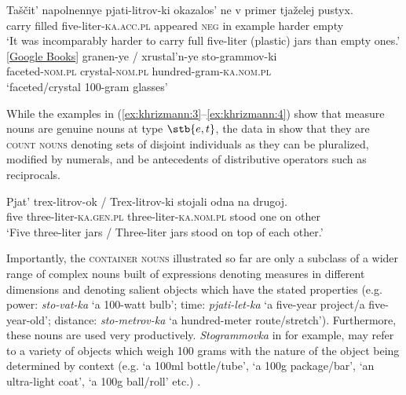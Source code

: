 \documentclass[output=paper]{langscibook}
\begin{document}
\ea\label{ex:khrizmann:3}
    \ea\label{ex:khrizmann:3a} \gll Taščit’ napolnennye pjati-litrov-ki okazalos’ ne v primer tjaželej pustyx.\\
    carry filled five-liter-\textsc{ka}.\textsc{acc.pl} appeared \textsc{neg} in example harder empty\\
    \glt `It was incomparably harder to carry full five-liter (plastic) jars than empty ones.' \hfill [\href{https://books.google.co.il/books?id=MeKhAAAAQBAJ&pg=PT111&lpg=PT111&dq=тащит+наполненные+пятилитровки&source}{Google Books}]
    \ex\label{ex:khrizmann:3b} \gll granen-ye {/} xrustal’n-ye sto-grammov-ki\\
    faceted-\textsc{nom.pl} {} crystal-\textsc{nom.pl} hundred-gram-\textsc{ka}.\textsc{nom.pl} \\
    \glt `faceted/crystal 100-gram glasses'
\z\z

\z

\noindent While the examples in (\ref{ex:khrizmann:3}--\ref{ex:khrizmann:4}) show that measure nouns are genuine nouns at type $\stb{e,t}$, the data in  show that they are \textsc{count nouns} denoting sets of disjoint individuals as they can be pluralized, modified by numerals, and be antecedents of distributive operators such as reciprocals.

\ea\label{ex:khrizmann:5} \gll Pjat’ trex-litrov-ok / Trex-litrov-ki stojali odna na drugoj.\\
five three-liter-\textsc{ka.gen.pl} {} three-liter-\textsc{ka.nom.pl} stood one on other\\
\glt `Five three-liter jars / Three-liter jars stood on top of each other.'
\z

\noindent Importantly, the \textsc{container nouns} illustrated so far are only a subclass of a wider range of complex nouns built of expressions denoting measures in different dimensions and denoting salient objects which have the stated properties (e.g. power: \textit{sto-vat-ka} `a 100-watt bulb'; time: \textit{pjati-let-ka} `a five-year project/a five-year-old'; distance: \textit{sto-metrov-ka} `a hundred-meter route/stretch'). Furthermore, these nouns are used very productively. \textit{Stogrammovka} in  for example, may refer to a variety of objects which weigh 100 grams with the nature of the object being determined by context (e.g. `a 100ml bottle/tube', `a 100g package/bar', `an ultra-light coat', `a 100g ball/roll' etc.) .
\end{document}
